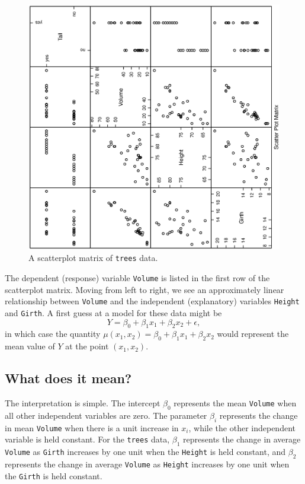 \documentclass[captions=tableheading]{scrbook}
\begin{document}
\begin{example}
\begin{figure}[th]
    \includegraphics[angle=270, totalheight=4in]{img/splom-trees.ps}
    \caption[Scatterplot matrix of \texttt{trees} data]{\small A scatterplot matrix of \texttt{trees} data.}
    \label{fig:splom-trees}
  \end{figure}

The dependent (response) variable \texttt{Volume} is listed in the first row of the scatterplot matrix. Moving from left to right, we see an approximately linear relationship between \texttt{Volume} and the independent (explanatory) variables \texttt{Height} and \texttt{Girth}. A first guess at a model for these data might be
\begin{equation}
Y=\beta_{0}+\beta_{1}x_{1}+\beta_{2}x_{2}+\epsilon,
\end{equation}
in which case the quantity \(\mu(x_{1},x_{2})=\beta_{0}+\beta_{1}x_{1}+\beta_{2}x_{2}\) would represent the mean value of \(Y\) at the point \((x_{1},x_{2})\).
\end{example}
\subsection{What does it mean?}
\label{sec-7-1-1}


The interpretation is simple. The intercept \(\beta_{0}\) represents the mean \texttt{Volume} when all other independent variables are zero. The parameter \(\beta_{i}\) represents the change in mean \texttt{Volume} when there is a unit increase in \(x_{i}\), while the other independent variable is held constant. For the \texttt{trees} data, \(\beta_{1}\) represents the change in average \texttt{Volume} as \texttt{Girth} increases by one unit when the \texttt{Height} is held constant, and \(\beta_{2}\) represents the change in average \texttt{Volume} as \texttt{Height} increases by one unit when the \texttt{Girth} is held constant. 
\end{document}
